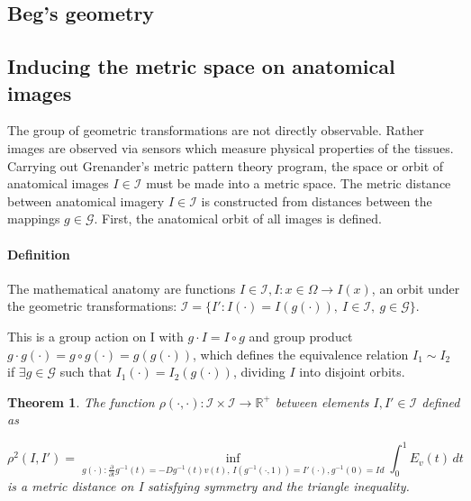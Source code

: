 \documentclass[final, paper=letter,5p,times,twocolumn]{elsarticle}
\newtheorem{theorem}{Theorem} %
\theoremstyle{definition}
\begin{document}
\subsection{Beg's geometry}



\subsection{Inducing the metric space on anatomical images}

The group of geometric transformations are not directly observable. Rather images are observed via sensors which measure physical properties of the tissues. Carrying out Grenander's metric pattern theory program, the space or orbit of anatomical images $I \in \mathcal{I}$ must be made into a metric space. The metric distance between anatomical imagery $I \in \mathcal{I}$ is constructed from distances between the mappings $g \in \mathcal{G}$. First, the anatomical orbit of all images is defined.

\paragraph{Definition}{The mathematical anatomy are functions $I \in \mathcal{I}, I: x \in \Omega \rightarrow I(x)$, an orbit under the geometric transformations: $\mathcal{I} = \lbrace I':I(\cdot) = I(g(\cdot)),~I \in \mathcal{I},~g \in \mathcal{G} \rbrace$.\\}

This is a group action on I with $g \cdot I = I \circ g$ and group product $g \cdot g(\cdot) = g \circ g(\cdot) = g(g(\cdot))$, which defines the equivalence relation $I_{1} \sim I_{2}$ if $\exists g \in \mathcal{G}$ such that $I_{1}(\cdot) = I_{2}(g(\cdot))$, dividing $I$ into disjoint orbits.



\begin{theorem}
The function $\rho(\cdot, \cdot): \mathcal{I} \times \mathcal{I} \rightarrow \mathbb{R}^{+}$ between elements $I, I' \in \mathcal{I}$ defined as

$$
\rho^{2}(I,I') = \underset{g(\cdot):\frac{\partial}{\partial t}g^{-1}(t) = -Dg^{-1}(t)v(t),\, I(g^{-1}(\cdot,1)) = I'(\cdot), g^{-1}(0) = Id}{\inf} \int_{0}^{1} E_{v}(t) \, dt
$$
is a metric distance on I satisfying symmetry and the triangle inequality.
\end{theorem}
\end{document}
